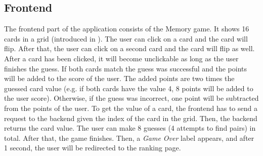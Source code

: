 \subsection{Frontend}\label{subsec:02_design_frontend}
The frontend part of the application consists of the Memory game.
It shows 16 cards in a grid (introduced in ). The user can click on a card and the card will flip. After that, the user can click on a second card and the card will flip as well. After a card has been clicked, it will become unclickable as long as the user finishes the guess.
If both cards match the guess was successful and the points will be added to the score of the user. The added points are two times the guessed card value (e.g. if both cards have the value 4, 8 points will be added to the user score). Otherwise, if the guess was incorrect, one point will be subtracted from the points of the user.
To get the value of a card, the frontend has to send a request to the backend given the index of the card in the grid. Then, the backend returns the card value.
The user can make 8 guesses (4 attempts to find pairs) in total. After that, the game finishes. Then, a \textit{Game Over} label appears, and after 1 second, the user will be redirected to the ranking page.

